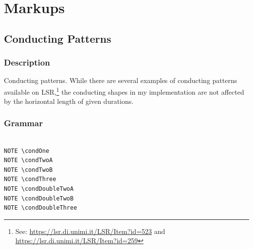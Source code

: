 \chapter {Markups}
\section {Conducting Patterns}
\subsection{Description}
Conducting patterns. While there are several examples of conducting patterns available on LSR,\footnote{See: \url{https://lsr.di.unimi.it/LSR/Item?id=523} and \url{https://lsr.di.unimi.it/LSR/Item?id=259}} the conducting shapes in my implementation are not affected by the horizontal length of given durations.
\subsection{Grammar}
\begin{verbatim}

NOTE \condOne
NOTE \condTwoA
NOTE \condTwoB
NOTE \condThree
NOTE \condDoubleTwoA
NOTE \condDoubleTwoB
NOTE \condDoubleThree

\end{verbatim}

